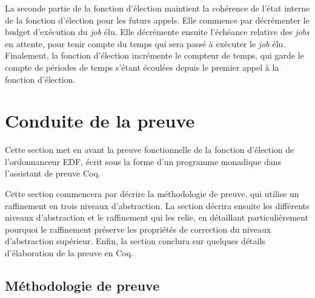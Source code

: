 		La seconde partie de la fonction d'élection maintient la cohérence de l'état interne de la fonction d'élection pour les futurs appels. Elle commence par décrémenter le budget d'exécution du \emph{job} élu. Elle décrémente ensuite l'échéance relative des \emph{jobs} en attente, pour tenir compte du temps qui sera passé à exécuter le \emph{job} élu. Finalement, la fonction d'élection incrémente le compteur de temps, qui garde le compte de périodes de temps s'étant écoulées depuis le premier appel à la fonction d'élection.

	\section{Conduite de la preuve}

	\label{sec:proof}
	Cette section met en avant la preuve fonctionnelle de la fonction d'élection de l'ordonnanceur EDF, écrit sous la forme d'un programme monadique dans l'assistant de preuve Coq.

	Cette section commencera par décrire la méthodologie de preuve, qui utilise un raffinement en trois niveaux d'abstraction. La section décrira ensuite les différents niveaux d'abstraction et le raffinement qui les relie, en détaillant particulièrement pourquoi le raffinement préserve les propriétés de correction du niveaux d'abstraction supérieur. Enfin, la section conclura sur quelques détails d'élaboration de la preuve en Coq.

	\subsection{Méthodologie de preuve}

